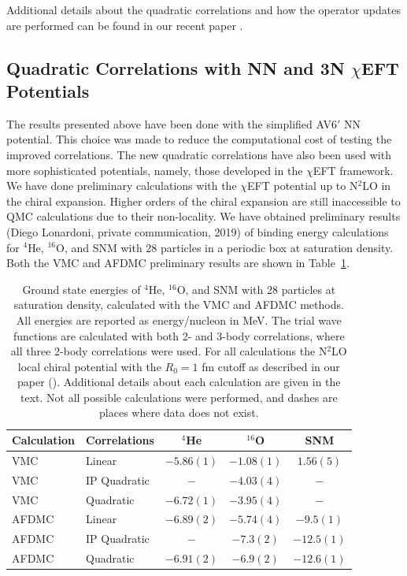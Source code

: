 Additional details about the quadratic correlations and how the operator updates are performed can be found in our recent paper \cite{lonardoni2018}.

\subsection{Quadratic Correlations with NN and 3N $\chi$EFT Potentials}
The results presented above have been done with the simplified AV6$'$ NN potential. This choice was made to reduce the computational cost of testing the improved correlations. The new quadratic correlations have also been used with more sophisticated potentials, namely, those developed in the $\chi$EFT framework. We have done preliminary calculations with the $\chi$EFT potential up to N$^2$LO in the chiral expansion. Higher orders of the chiral expansion are still inaccessible to QMC calculations due to their non-locality. We have obtained preliminary results (Diego Lonardoni, private communication, 2019) of binding energy calculations for $^4$He, $^{16}$O, and SNM with 28 particles in a periodic box at saturation density. Both the VMC and AFDMC preliminary results are shown in Table~\ref{tab:chiquad}.
\begin{table}[htb]
   \centering
   \begin{tabular}{llccc}
      \hline
      Calculation & Correlations & $^4$He & $^{16}$O & SNM \\
      \hline
      VMC   & Linear       & $-5.86(1)$ & $-1.08(1)$ & $1.56(5)$ \\
      VMC   & IP Quadratic & $-$        & $-4.03(4)$ & $-$ \\
      VMC   & Quadratic    & $-6.72(1)$ & $-3.95(4)$ & $-$ \\
      \hline
      AFDMC & Linear       & $-6.89(2)$ & $-5.74(4)$ & $-9.5(1)$ \\
      AFDMC & IP Quadratic & $-$        & $-7.3(2)$  & $-12.5(1)$ \\
      AFDMC & Quadratic    & $-6.91(2)$ & $-6.9(2)$  & $-12.6(1)$ \\
      \hline
   \end{tabular}
   \caption{Ground state energies of $^4$He, $^{16}$O, and SNM with 28 particles at saturation density, calculated with the VMC and AFDMC methods. All energies are reported as energy/nucleon in MeV. The trial wave functions are calculated with both 2- and 3-body correlations, where all three 2-body correlations were used. For all calculations the N$^2$LO local chiral potential with the $R_0 = 1$ fm cutoff as described in our paper (\cite{lonardoni2018}). Additional details about each calculation are given in the text. Not all possible calculations were performed, and dashes are places where data does not exist.}
   \label{tab:chiquad}
\end{table}
